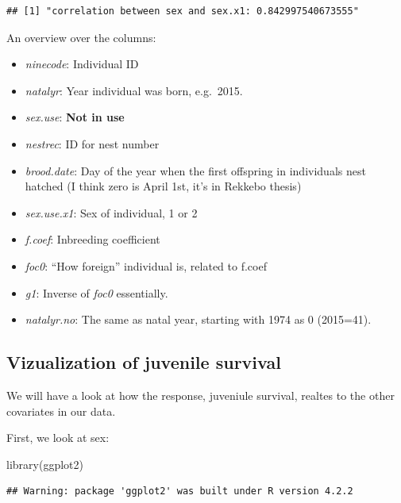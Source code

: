 \documentclass[
]{article}
\newenvironment{Shaded}{\begin{snugshade}}{\end{snugshade}}
\newcommand{\FunctionTok}[1]{\textcolor[rgb]{0.00,0.00,0.00}{#1}}
\newcommand{\NormalTok}[1]{#1}
\providecommand{\tightlist}{%
  \setlength{\itemsep}{0pt}\setlength{\parskip}{0pt}}
\begin{document}
\begin{verbatim}
## [1] "correlation between sex and sex.x1: 0.842997540673555"
\end{verbatim}

An overview over the columns:

\begin{itemize}
\tightlist
\item
  \emph{ninecode}: Individual ID
\item
  \emph{natalyr}: Year individual was born, e.g.~2015.
\item
  \emph{sex.use}: \textbf{Not in use}
\item
  \emph{nestrec}: ID for nest number
\item
  \emph{brood.date}: Day of the year when the first offspring in
  individuals nest hatched (I think zero is April 1st, it's in Rekkebo
  thesis)
\item
  \emph{sex.use.x1}: Sex of individual, 1 or 2
\item
  \emph{f.coef}: Inbreeding coefficient
\item
  \emph{foc0}: ``How foreign'' individual is, related to f.coef
\item
  \emph{g1}: Inverse of \emph{foc0} essentially.
\item
  \emph{natalyr.no}: The same as natal year, starting with 1974 as 0
  (2015=41).
\end{itemize}

\hypertarget{vizualization-of-juvenile-survival}{%
\subsection*{Vizualization of juvenile
survival}\label{vizualization-of-juvenile-survival}}

We will have a look at how the response, juveniule survival, realtes to
the other covariates in our data.

First, we look at sex:

\begin{Shaded}
\begin{Highlighting}[]
\FunctionTok{library}\NormalTok{(ggplot2)}
\end{Highlighting}
\end{Shaded}

\begin{verbatim}
## Warning: package 'ggplot2' was built under R version 4.2.2
\end{verbatim}
\end{document}
